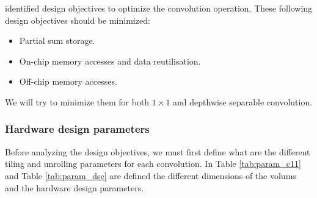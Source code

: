 \textcite{ma_optimizing_2018} identified design objectives to optimize the convolution operation. These following design objectives should be minimized:
%
\begin{itemize}
    \item Partial sum storage.
    \item On-chip memory accesses and data reutilisation.
    \item Off-chip memory accesses.
\end{itemize}
%
We will try to minimize them for both $1 \times 1$ and depthwise separable convolution.
%
\subsubsection{Hardware design parameters}
%
Before analyzing the design objectives, we must first define what are the different tiling and unrolling parameters for each convolution. In Table \ref{tab:param_c11} and Table \ref{tab:param_dsc} are defined the different dimensions of the volums and the hardware design parameters.

